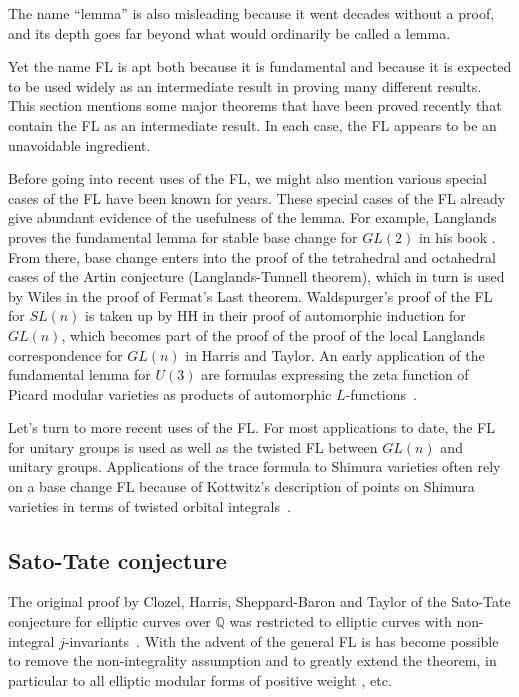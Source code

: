 \documentclass[brochure,english,12pt]{bourbaki}
\newcommand{\ring}[1]{\mathbb{#1}}
\begin{document}
The name ``lemma'' is also misleading because it went decades
without a proof, and its depth goes far beyond what would ordinarily be
called a lemma.  

Yet the name FL is apt both because it is fundamental and
because it is expected to be used widely as an intermediate result in
proving many different results.  This section mentions some major
theorems that have been proved recently that contain the FL as an
intermediate result.  In each case, the FL appears to be
an unavoidable ingredient.

Before going into recent uses of the FL, we might also mention various
special cases of the FL have been known for years.  These special
cases of the FL already give abundant evidence of the usefulness of
the lemma.  For example, Langlands proves the fundamental lemma for
stable base change for $GL(2)$ in his book \cite[Lemma~5.10]{BC}.
From there, base change enters into the proof of the tetrahedral and
octahedral cases of the Artin conjecture (Langlands-Tunnell theorem),
which in turn is used by Wiles in the proof of Fermat's Last theorem.
Waldspurger's proof of the FL for $SL(n)$ is taken up by HH in their
proof of automorphic induction for $GL(n)$, which becomes part of the
proof of the proof of the local Langlands correspondence for $GL(n)$
in Harris and Taylor.  An early application of the fundamental lemma
for $U(3)$ are formulas expressing the zeta function of Picard modular
varieties as products of automorphic $L$-functions~\cite{Pic}.

Let's turn to more recent uses of the FL.   For most applications to date,
the FL for unitary groups is used as well as the twisted FL between $GL(n)$
and unitary groups.  Applications of the trace formula to Shimura varieties often rely on
a  base change FL because of Kottwitz's description of points on Shimura
varieties in terms of twisted orbital integrals~\cite{Kottwitz}.



\subsection{Sato-Tate conjecture}

The original proof by Clozel, Harris, Sheppard-Baron and Taylor
of the Sato-Tate conjecture for elliptic curves over
$\ring{Q}$ was restricted to elliptic curves with non-integral
$j$-invariants~\cite{XX}.
With the advent of the general FL is has become possible to remove
the non-integrality assumption and to greatly extend the theorem, in particular 
to all elliptic modular forms of positive weight \cite{Barnet-Lamb}, etc.
\end{document}
